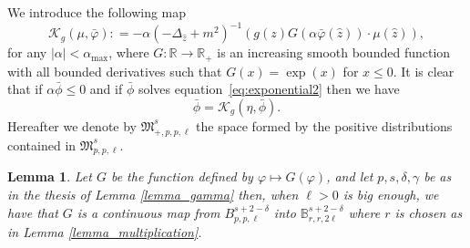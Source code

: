 \documentclass[a4paper,10pt]{article}
\newtheorem{lemma}[theorem]{Lemma}
\begin{document}
We introduce the following map
\[ \mathcal{K}_g (\mu, \bar{\varphi}) : = - \alpha (- \Delta_{\hat{z}} +
   m^2)^{- 1} (g (z) G (\alpha \bar{\varphi} (\hat{z})) \cdot \mu (\hat{z})),
\]
for any $| \alpha | <\alpha_{\text{max}}$, where $G : \mathbb{R}
\rightarrow \mathbb{R}_+$ is an increasing smooth bounded function with all
bounded derivatives such that $G (x) = \exp (x)$ for $x \leqslant 0$. It is
clear that if $\alpha \bar{\phi} \leqslant 0$ and if $\bar{\phi}$ solves
equation~{\eqref{eq:exponential2}} then we have
\[ \bar{\phi} = \mathcal{K}_g (\eta, \bar{\phi}) . \]
Hereafter we denote by $\mathfrak{M}^s_{+, p, p, \ell}$ the space formed by
the positive distributions contained in $\mathfrak{M}^s_{p, p, \ell}$.

\begin{lemma}
  \label{lemma_G}Let $G$ be the function defined by $\varphi \longmapsto G
  (\varphi)$, and let $p, s, \delta, \gamma$ be as in the thesis of Lemma
  \ref{lemma_gamma} then, when $\ell > 0$ is big enough, we have that $G$ is a
  continuous map from $B^{s + 2 - \delta}_{p, p, \ell}$ into $\mathbb{B}^{s +
  2 - \delta}_{r, r, 2 \ell}$ where $r$ is chosen as in Lemma
  \ref{lemma_multiplication}.
\end{lemma}
\end{document}
